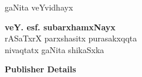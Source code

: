 \thispagestyle{empty}
\begin{center}
{\fontsize{30}{32}\selectfont gaNita veYvidhayx}
\vfill


{\LARGE\bfseries veY. esf. subarxhamxNayx}\\[4pt]
{\large rASaTxrX parxshasitx purasakxqqta\\[4pt]
nivaqtatx gaNita shikaSxka}
\vfill

{\Large\rm\bfseries Publisher Details}





\end{center}
